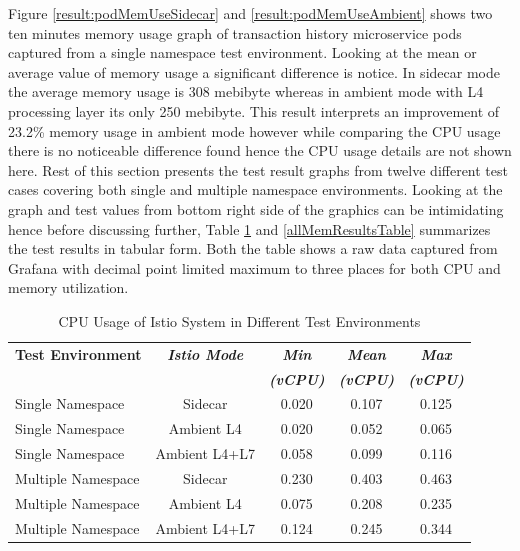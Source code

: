 Figure \ref{result:podMemUseSidecar} and \ref{result:podMemUseAmbient} shows two ten minutes memory usage graph of transaction history microservice pods captured from a single namespace test environment. Looking at the mean or average value of memory usage a significant difference is notice. In sidecar mode the average memory usage is 308 \Gls{mebibyte} whereas in ambient mode with L4 processing layer its only 250 \Gls{mebibyte}. This result interprets an improvement of 23.2\% memory usage in ambient mode however while comparing the CPU usage there is no noticeable difference found hence the CPU usage details are not shown here. Rest of this section presents the test result graphs from twelve different test cases covering both single and multiple namespace environments. Looking at the graph and test values from bottom right side of the graphics can be intimidating hence before discussing further, Table \ref{allCpuResultsTable} and \ref{allMemResultsTable} summarizes the test results in tabular form. Both the table shows a raw data captured from Grafana with decimal point limited maximum to three places for both CPU and memory utilization.

\begin{table}[ht!]
  \centering
  \begin{tabular}{ |l|c|c|c|c|}
    \hline
    \textbf{Test Environment} & \textbf{\textit{Istio Mode}} & \textbf{\textit{Min}} & \textbf{\textit{Mean}} & \textbf{\textit{Max}} \\
    \textbf{\textit{ }} & \textbf{\textit{ }} & \textbf{\textit{(vCPU)}} & \textbf{\textit{(vCPU)}} & \textbf{\textit{(vCPU)}} \\ \hline
    Single Namespace & Sidecar & 0.020 & 0.107 & 0.125 \\ \hline
    Single Namespace & Ambient L4 & 0.020 & 0.052 & 0.065 \\ \hline
    Single Namespace & Ambient L4+L7 & 0.058 & 0.099 & 0.116 \\ \hline

    Multiple Namespace & Sidecar & 0.230 & 0.403 & 0.463 \\ \hline
    Multiple Namespace & Ambient L4 & 0.075 & 0.208 & 0.235 \\ \hline
    Multiple Namespace & Ambient L4+L7 & 0.124 & 0.245 & 0.344 \\ \hline
  \end{tabular}
  \caption{CPU Usage of Istio System in Different Test Environments}
  \label{allCpuResultsTable}
\end{table}

